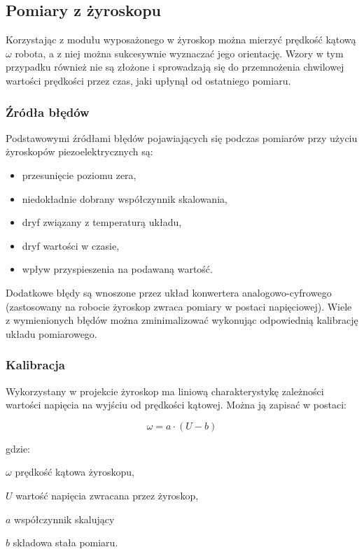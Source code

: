 \subsection{Pomiary z żyroskopu}

Korzystając z modułu wyposażonego w żyroskop można mierzyć prędkość kątową
$\omega$ robota, a z niej można sukcesywnie wyznaczać jego orientację. Wzory w
tym przypadku również nie są złożone i sprowadzają się do przemnożenia chwilowej
wartości prędkości przez czas, jaki upłynął od ostatniego pomiaru. 

\subsubsection{Źródła błędów}

Podstawowymi źródłami błędów pojawiających się podczas pomiarów przy użyciu
żyroskopów piezoelektrycznych są:

\begin{itemize}
  \item przesunięcie poziomu zera,
  \item niedokładnie dobrany współczynnik skalowania,
  \item dryf związany z temperaturą układu,
  \item dryf wartości w czasie,
  \item wpływ przyspieszenia na podawaną wartość.
\end{itemize}

Dodatkowe błędy są wnoszone przez układ konwertera analogowo-cyfrowego
(zastosowany na robocie żyroskop zwraca pomiary w postaci napięciowej).
Wiele z wymienionych błędów można zminimalizować wykonując odpowiednią
kalibrację układu pomiarowego.

\subsubsection{Kalibracja}

Wykorzystany w projekcie żyroskop ma liniową charakterystykę zależności
wartości napięcia na wyjściu od prędkości kątowej. Można ją zapisać w postaci:

\[
\omega = a \cdot (U - b)
\]

gdzie:

\begin{mydescription}{5pt}
\item[$\omega$] prędkość kątowa żyroskopu,
\item[$U$] wartość napięcia zwracana przez żyroskop,
\item[$a$] współczynnik skalujący 
\item[$b$] składowa stała pomiaru. 
\end{mydescription}

